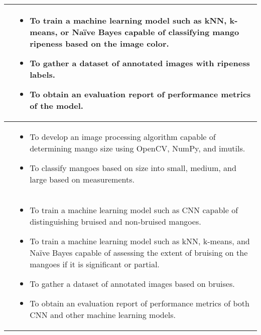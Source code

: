 \begin{center}
{\begin{longtable}{p{}|p{}}
			\Paste{SO5} & \begin{itemize}
				\item To train a machine learning model such as kNN, k-means, or Naïve Bayes capable
				of classifying mango ripeness based on the image color.
				\item To gather a dataset of annotated images with ripeness labels.
				\item To obtain an evaluation report of performance metrics of the model.
			\end{itemize} \\ \hline
			
			\Paste{SO6} & \begin{itemize}
				\item To develop an image processing algorithm capable of determining mango 
				size using OpenCV, NumPy, and imutils.
				\item To classify mangoes based on size into small, medium, and large based on measurements.
			\end{itemize} \\ \hline
			
			\Paste{SO7} & \begin{itemize}
				\item To train a machine learning model such as 
				CNN capable of distinguishing bruised and non-bruised mangoes.
				\item To train a machine learning model such as kNN, k-means, and Naïve Bayes 
				capable of assessing the extent of bruising on the mangoes if it is significant or partial.
				\item To gather a dataset of annotated images based on bruises.
				\item To obtain an evaluation report of performance metrics of both CNN and other machine learning models.
			\end{itemize} \\ \hline
			
		\end{longtable}
	}
\end{center}

